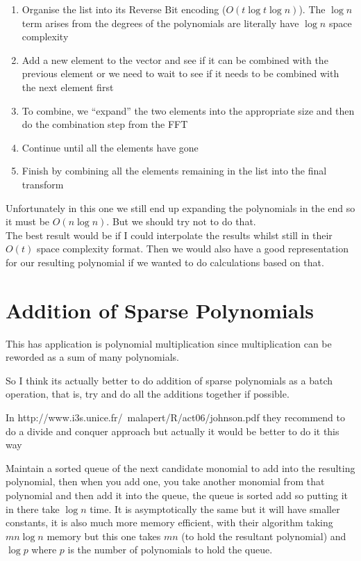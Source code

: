 \begin{enumerate}[1.]
  \item Organise the list into its Reverse Bit encoding ($O(t \log t \log n)$). The $\log n$ term arises from the degrees of the polynomials are literally have $\log n$ space complexity
  \item Add a new element to the vector and see if it can be combined with the previous element or we need to wait to see if it needs to be combined with the next element first
  \item To combine, we ``expand'' the two elements into the appropriate size and then do the combination step from the FFT
  \item Continue until all the elements have gone
  \item Finish by combining all the elements remaining in the list into the final transform
\end{enumerate}

Unfortunately in this one we still end up expanding the polynomials in the end so it must be $O(n\log n)$. But we should try not to do that.\\
The best result would be if I could interpolate the results whilst still in their $O(t)$ space complexity format. Then we would also have a good representation for our resulting polynomial if we wanted to do calculations based on that.

\section{Addition of Sparse Polynomials}

This has application is polynomial multiplication since multiplication can be reworded as a sum of many polynomials.

So I think its actually better to do addition of sparse polynomials as a batch operation, that is, try and do all the additions together if possible.

In http://www.i3s.unice.fr/~malapert/R/act06/johnson.pdf they recommend to do a divide and conquer approach but actually it would be better to do it this way

Maintain a sorted queue of the next candidate monomial to add into the resulting polynomial, then when you add one, you take another monomial from that polynomial and then add it into the queue, the queue is sorted add so putting it in there take $\log n$ time. It is asymptotically the same but it will have smaller constants, it is also much more memory efficient, with their algorithm taking $mn\log n$ memory but this one takes $mn$ (to hold the resultant polynomial) and $\log p$ where $p$ is the number of polynomials to hold the queue.

